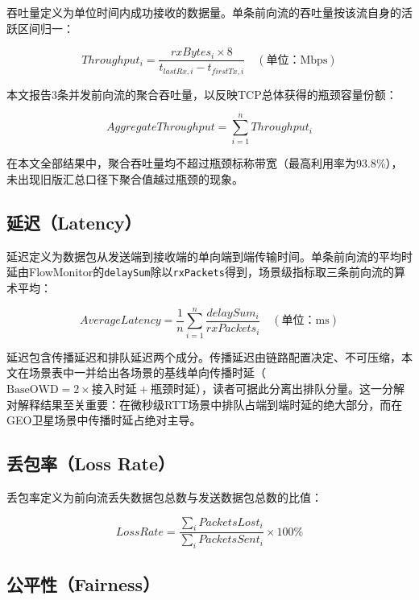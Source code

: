 吞吐量定义为单位时间内成功接收的数据量。单条前向流的吞吐量按该流自身的活跃区间归一：

\begin{equation}
Throughput_i = \frac{rxBytes_i \times 8}{t_{lastRx,i} - t_{firstTx,i}} \quad (\text{单位：Mbps})
\end{equation}

本文报告3条并发前向流的聚合吞吐量，以反映TCP总体获得的瓶颈容量份额：

\begin{equation}
AggregateThroughput = \sum_{i=1}^{n} Throughput_i
\end{equation}

在本文全部结果中，聚合吞吐量均不超过瓶颈标称带宽（最高利用率为93.8\%），未出现旧版汇总口径下聚合值越过瓶颈的现象。

\subsection{延迟（Latency）}

延迟定义为数据包从发送端到接收端的单向端到端传输时间。单条前向流的平均时延由FlowMonitor的\texttt{delaySum}除以\texttt{rxPackets}得到，场景级指标取三条前向流的算术平均：

\begin{equation}
AverageLatency = \frac{1}{n}\sum_{i=1}^{n} \frac{delaySum_i}{rxPackets_i} \quad (\text{单位：ms})
\end{equation}

延迟包含传播延迟和排队延迟两个成分。传播延迟由链路配置决定、不可压缩，本文在场景表中一并给出各场景的基线单向传播时延（$\text{BaseOWD} = 2 \times \text{接入时延} + \text{瓶颈时延}$），读者可据此分离出排队分量。这一分解对解释结果至关重要：在微秒级RTT场景中排队占端到端时延的绝大部分，而在GEO卫星场景中传播时延占绝对主导。

\subsection{丢包率（Loss Rate）}

丢包率定义为前向流丢失数据包总数与发送数据包总数的比值：

\begin{equation}
LossRate = \frac{\sum_i PacketsLost_i}{\sum_i PacketsSent_i} \times 100\%
\end{equation}

\subsection{公平性（Fairness）}

